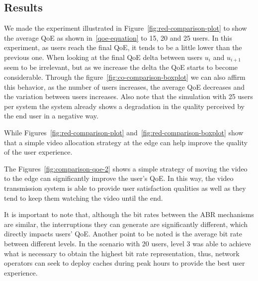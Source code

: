 



\subsection{Results}

We made the experiment illustrated in Figure~\ref{fig:red-comparison-plot} to show the average QoE as shown in~\ref{qoe-equation} to 15, 20 and 25 users. In this experiment, as users reach the final QoE, it tends to be a little lower than the previous one. When looking at the final QoE delta between users $u_{i}$ and $u_{i + 1}$ seem to be irrelevant, but as we increase the delta the QoE starts to become considerable. Through the figure~\ref{fig:co-comparison-boxplot} we can also affirm this behavior, as the number of users increases, the average QoE decreases and the variation between users increases. Also note that the simulation with 25 users per system the system already shows a degradation in the quality perceived by the end user in a negative way.

While Figures~\ref{fig:red-comparison-plot} and~\ref{fig:red-comparison-boxplot} show that a simple video allocation strategy at the edge can help improve the quality of the user experience.

The Figures~\ref{fig:comparison-qoe-2} shows a simple strategy of moving the video to the edge can significantly improve the user's QoE. In this way, the video transmission system is able to provide user satisfaction qualities as well as they tend to keep them watching the video until the end. 

It is important to note that, although the bit rates between the ABR mechanisms are similar, the interruptions they can generate are significantly different, which directly impacts users' QoE. Another point to be noted is the average bit rate between different levels. In the scenario with 20 users, level 3 was able to achieve what is necessary to obtain the highest bit rate representation, thus, network operators can seek to deploy caches during peak hours to provide the best user experience.
